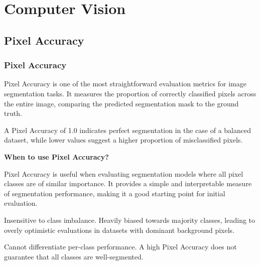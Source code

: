\chapter{Computer Vision}

\clearpage
\thispagestyle{cvstyle}
\section{Pixel Accuracy}
\subsection{Pixel Accuracy}


Pixel Accuracy is one of the most straightforward evaluation metrics for image segmentation tasks. It measures the proportion
of correctly classified pixels across the entire image, comparing the predicted segmentation mask to the ground truth.

\begin{center}
\end{center}

A Pixel Accuracy of 1.0 indicates perfect segmentation in the case of a balanced dataset, while lower values suggest a higher proportion of misclassified pixels.


\textbf{When to use Pixel Accuracy?}

Pixel Accuracy is useful when evaluating segmentation models where all pixel classes are of similar importance.
It provides a simple and interpretable measure of segmentation performance, making it a good starting point for initial
evaluation.

{
\item Insensitive to class imbalance. Heavily biased towards majority classes, leading to overly optimistic
evaluations in datasets with dominant background pixels.
\item Cannot differentiate per-class performance. A high Pixel Accuracy does not guarantee that all classes are well-segmented.
}

